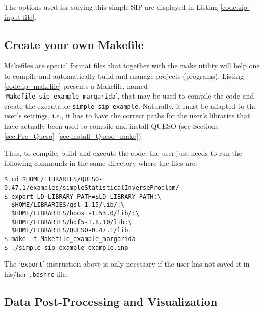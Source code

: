 The options used for solving this simple SIP are displayed in Listing \ref{code:sip-input-file}.





\subsection{Create your own Makefile}\label{sec:sip-makefile}

Makefiles are special format files that together with the make utility will help one to compile and automatically build and manage projects (programs).  
Listing \ref{code:ip_makefile} presents a Makefile, named `\texttt{Makefile\_sip\_example\_margarida}', that may be used to compile the code and create the executable \verb+simple_sip_example+. Naturally, it must be adapted to the user's settings, i.e., it has to have the correct paths for the user's libraries that have actually been used to compile and install QUESO  (see Sections \ref{sec:Pre_Queso}--\ref{sec:install_Queso_make}).



Thus, to compile, build and execute the code, the user just needs to run the following commands in the same directory where the files are:
\begin{lstlisting}
$ cd $HOME/LIBRARIES/QUESO-0.47.1/examples/simpleStatisticalInverseProblem/
$ export LD_LIBRARY_PATH=$LD_LIBRARY_PATH:\
  $HOME/LIBRARIES/gsl-1.15/lib/:\
  $HOME/LIBRARIES/boost-1.53.0/lib/:\
  $HOME/LIBRARIES/hdf5-1.8.10/lib:\
  $HOME/LIBRARIES/QUESO-0.47.1/lib 
$ make -f Makefile_example_margarida 
$ ./simple_sip_example example.inp
\end{lstlisting}

The `\verb+export+' instruction above is only necessary if the user has not saved it in his/her \verb+.bashrc+ file. 


\subsection{Data Post-Processing and Visualization}\label{sec:sip-results}


